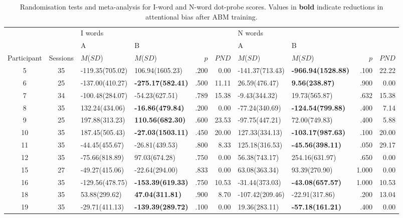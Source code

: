 \begin{sidewaystable}[!htbp]
\begin{threeparttable}
[!htbp]
\centering
\caption{Randomisation tests and meta-analysis for I-word and N-word dot-probe scores. Values in \textbf{bold} indicate reductions in attentional bias after ABM training.} 
\label{tab:rt}
{\footnotesize
\begin{tabular}{ccllrrllrr}
  \toprule 
 & & I words & & & & N words\\
 \cline{3-8} 
 & & A & B & & & A & B\\
 \cline{3-10} 
 Participant & Sessions &
					  ${M}$(${SD}$) & ${M}$(${SD}$) &  ${p}$\tabfnm{b}  & ${PND}$ & ${M}$(${SD}$) &
					  ${M}$(${SD}$) & ~ ${p}$\tabfnm{b}  & ${PND}$\\
 \midrule 
 5 & 35 & -119.35(705.02) & 106.94(1605.23) & .200 & 0.00 & -141.37(713.43) & \textbf{-966.94(1528.88)} & .100 & 22.22 \\ 
  6 & 25 & -137.00(410.27) & \textbf{-275.17(582.41)} & .500 & 11.11 & 26.59(476.47) & \textbf{9.56(238.87)} & .900 & 0.00 \\ 
  7 & 34 & -100.48(284.07) & -54.23(627.51) & .789 & 15.38 & -9.43(344.32) & 19.73(565.87) & .632 & 15.38 \\ 
  8 & 35 & 132.24(434.06) & \textbf{-16.86(479.84)} & .200 & 0.00 & -77.24(340.69) & \textbf{-124.54(799.88)} & .400 & 7.14 \\ 
  9 & 25 & 197.88(313.23) & \textbf{110.56(682.30)} & .600 & 23.53 & -97.75(447.21) & 72.00(749.83) & .400 & 5.88 \\ 
  10 & 35 & 187.45(505.43) & \textbf{-27.03(1503.11)} & .450 & 20.00 & 127.33(334.13) & \textbf{-103.17(987.63)} & .100 & 20.00 \\ 
  11 & 35 & -44.45(455.67) & -26.81(439.53) & .800 & 8.33 & 125.18(316.53) & \textbf{-45.56(398.11)} & .050 & 29.17 \\ 
  12 & 35 & -75.66(818.89) & 97.03(674.28) & .750 & 0.00 & 56.38(743.17) & 254.16(631.97) & .650 & 0.00 \\ 
  15 & 27 & -49.27(415.06) & -22.64(294.00) & .833 & 0.00 & 63.08(363.34) & 93.39(270.90) & 1.000 & 0.00 \\ 
  16 & 35 & -129.56(478.75) & \textbf{-153.39(619.33)} & .750 & 10.53 & -31.44(373.03) & \textbf{-43.08(657.57)} & 1.000 & 10.53 \\ 
  18 & 35 & 53.88(299.62) & \textbf{47.04(311.81)} & .900 & 8.70 & -107.42(209.46) & -22.91(317.86) & .200 & 13.04 \\ 
  19 & 35 & -29.71(411.13) & \textbf{-139.39(289.72)} & .100 & 0.00 & 19.36(283.11) & \textbf{-57.18(161.21)} & .400 & 0.00 \\ 
   \cline{5-5} \cline{9-9}
						

\end{tabular}}
\end{threeparttable}
\end{sidewaystable}
